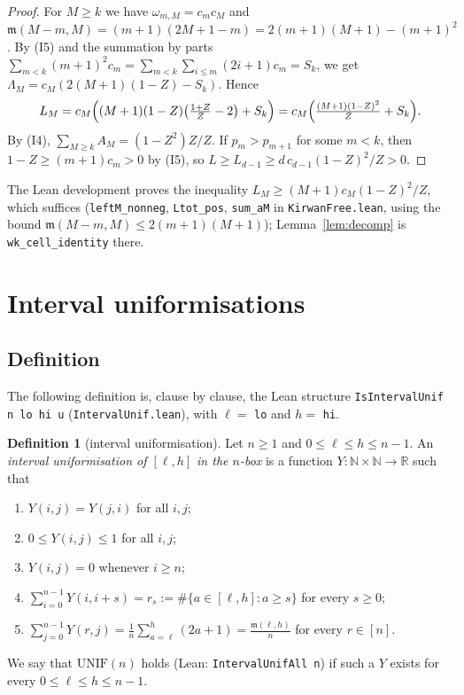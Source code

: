 \documentclass[11pt]{amsart}
\theoremstyle{definition}
\newtheorem{definition}[lemma]{Definition}
\theoremstyle{remark}
\numberwithin{equation}{section}
\newcommand{\R}{\mathbb{R}}
\newcommand{\N}{\mathbb{N}}
\newcommand{\ms}{\mathfrak{m}}
\newcommand{\lean}[1]{\texttt{#1}}
\begin{document}
\begin{proof}
For $M\ge k$ we have $\omega_{m,M}=c_mc_M$ and $\ms(M-m,M)=(m+1)(2M+1-m)=2(m+1)(M+1)-(m+1)^2$. By (I5)
and the summation by parts $\sum_{m<k}(m+1)^2c_m=\sum_{m<k}\sum_{i\le m}(2i+1)c_m=S_k$, we get
$\Lambda_M=c_M(2(M+1)(1-Z)-S_k)$. Hence
\[
  L_M=c_M\Bigl((M+1)(1-Z)\bigl(\tfrac{1+Z}{Z}-2\bigr)+S_k\Bigr)=c_M\Bigl(\tfrac{(M+1)(1-Z)^2}{Z}+S_k\Bigr).
\]
By (I4), $\sum_{M\ge k}A_M=(1-Z^2)Z/Z$. If $p_m>p_{m+1}$ for some $m<k$, then $1-Z\ge(m+1)c_m>0$ by
(I5), so $L\ge L_{d-1}\ge d\,c_{d-1}(1-Z)^2/Z>0$.
\end{proof}

The Lean development proves the inequality $L_M\ge(M+1)c_M(1-Z)^2/Z$, which suffices
(\lean{leftM\_nonneg}, \lean{Ltot\_pos}, \lean{sum\_aM} in \lean{KirwanFree.lean}, using the bound
$\ms(M-m,M)\le2(m+1)(M+1)$); Lemma~\ref{lem:decomp} is \lean{wk\_cell\_identity} there.

\section{Interval uniformisations}\label{sec:unif}

\subsection{Definition}
The following definition is, clause by clause, the Lean structure \lean{IsIntervalUnif n lo hi u}
(\lean{IntervalUnif.lean}), with $\ell=$ \lean{lo} and $h=$ \lean{hi}.

\begin{definition}[interval uniformisation]\label{def:unif}
Let $n\ge1$ and $0\le\ell\le h\le n-1$. An \emph{interval uniformisation of $[\ell,h]$ in the $n$-box} is
a function $Y:\N\times\N\to\R$ such that
\begin{enumerate}
\item[(U1)] $Y(i,j)=Y(j,i)$ for all $i,j$;
\item[(U2)] $0\le Y(i,j)\le1$ for all $i,j$;
\item[(U3)] $Y(i,j)=0$ whenever $i\ge n$;
\item[(U4)] $\sum_{i=0}^{n-1}Y(i,i+s)=r_s:=\#\{a\in[\ell,h]:a\ge s\}$ for every $s\ge0$;
\item[(U5)] $\sum_{j=0}^{n-1}Y(r,j)=\frac1n\sum_{a=\ell}^{h}(2a+1)=\frac{\ms(\ell,h)}{n}$ for every $r\in[n]$.
\end{enumerate}
We say that $\mathrm{UNIF}(n)$ holds (Lean: \lean{IntervalUnifAll n}) if such a $Y$ exists for every
$0\le\ell\le h\le n-1$.
\end{definition}
\end{document}

